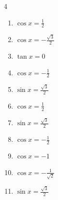 \begin{multicols}{4}
\begin{enumerate}
  \item $\displaystyle \cos{x}  = \frac{1}{2}$


  \item $\displaystyle \cos{x}  = -\frac{\sqrt{3}}{2}$


  \item $\displaystyle \tan{x}  = 0$

        \phantom{$\displaystyle x = 0 , \pi$}

  \item $\displaystyle \cos{x}  = -\frac{1}{2}$


  \item $\displaystyle \sin{x}  = \frac{\sqrt{3}}{2}$


\columnbreak %

  \item $\displaystyle \cos{x}  = \frac{1}{2}$


  \item $\displaystyle \sin{x}  = \frac{\sqrt{3}}{2}$


  \item $\displaystyle \cos{x}  = -\frac{1}{2}$


  \item $\displaystyle \cos{x}  = -1$

        \phantom{$\displaystyle x = \pi$}

  \item $\displaystyle \cos{x}  = -\frac{1}{\sqrt{2}}$


  \item $\displaystyle \sin{x}  = \frac{\sqrt{3}}{2}$



\end{enumerate}
\end{multicols}
